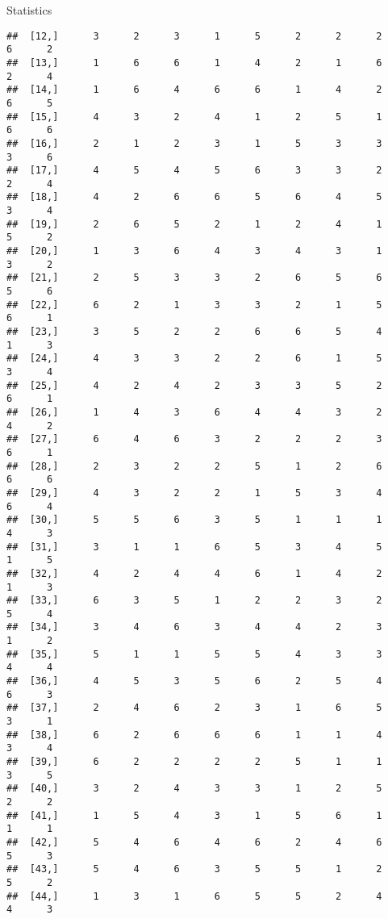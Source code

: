 \documentclass[
  ignorenonframetext,
]{beamer}
\begin{document}
\begin{frame}[fragile]{Statistics}
\begin{verbatim}
##  [12,]      3      2      3      1      5      2      2      2      6      2
##  [13,]      1      6      6      1      4      2      1      6      2      4
##  [14,]      1      6      4      6      6      1      4      2      6      5
##  [15,]      4      3      2      4      1      2      5      1      6      6
##  [16,]      2      1      2      3      1      5      3      3      3      6
##  [17,]      4      5      4      5      6      3      3      2      2      4
##  [18,]      4      2      6      6      5      6      4      5      3      4
##  [19,]      2      6      5      2      1      2      4      1      5      2
##  [20,]      1      3      6      4      3      4      3      1      3      2
##  [21,]      2      5      3      3      2      6      5      6      5      6
##  [22,]      6      2      1      3      3      2      1      5      6      1
##  [23,]      3      5      2      2      6      6      5      4      1      3
##  [24,]      4      3      3      2      2      6      1      5      3      4
##  [25,]      4      2      4      2      3      3      5      2      6      1
##  [26,]      1      4      3      6      4      4      3      2      4      2
##  [27,]      6      4      6      3      2      2      2      3      6      1
##  [28,]      2      3      2      2      5      1      2      6      6      6
##  [29,]      4      3      2      2      1      5      3      4      6      4
##  [30,]      5      5      6      3      5      1      1      1      4      3
##  [31,]      3      1      1      6      5      3      4      5      1      5
##  [32,]      4      2      4      4      6      1      4      2      1      3
##  [33,]      6      3      5      1      2      2      3      2      5      4
##  [34,]      3      4      6      3      4      4      2      3      1      2
##  [35,]      5      1      1      5      5      4      3      3      4      4
##  [36,]      4      5      3      5      6      2      5      4      6      3
##  [37,]      2      4      6      2      3      1      6      5      3      1
##  [38,]      6      2      6      6      6      1      1      4      3      4
##  [39,]      6      2      2      2      2      5      1      1      3      5
##  [40,]      3      2      4      3      3      1      2      5      2      2
##  [41,]      1      5      4      3      1      5      6      1      1      1
##  [42,]      5      4      6      4      6      2      4      6      5      3
##  [43,]      5      4      6      3      5      5      1      2      5      2
##  [44,]      1      3      1      6      5      5      2      4      4      3

\end{verbatim}
\end{frame}
\end{document}
